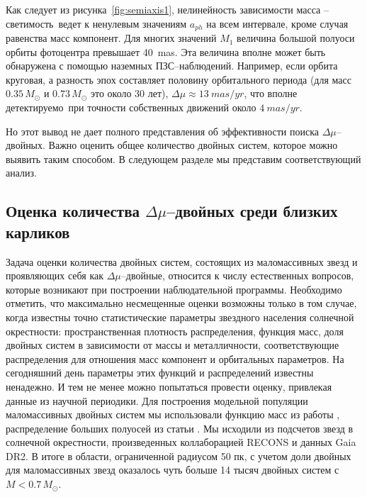 Как следует из рисунка~\ref{fig:semiaxis1}, нелинейность зависимости \glqq масса -- светимость\grqq\ ведет к ненулевым значениям $a_{ph}$ на всем интервале, кроме случая равенства масс компонент. Для многих значений $M_1$ величина большой полуоси орбиты фотоцентра превышает 40~mas. Эта величина вполне может быть обнаружена с помощью наземных ПЗС--наблюдений. Например, если орбита круговая, а разность эпох составляет половину орбитального периода (для масс  $0.35\,M_\odot$ и $0.73\,M_\odot$ это около 30 лет), $\Delta\mu\approx 13~mas/yr$, что вполне \glqq детектируемо\grqq\ при точности собственных движений около $4~mas/yr$.  

Но этот вывод не дает полного представления об эффективности поиска  $\Delta\mu$--двойных. Важно оценить общее количество двойных систем, которое можно выявить таким способом. В следующем разделе мы представим соответствующий анализ.

\subsection{Оценка количества $\Delta\mu$--двойных среди близких карликов}\label{subsec:ch1/sect2/sub2}
Задача оценки количества двойных систем, состоящих из маломассивных звезд и проявляющих себя как $\Delta\mu$--двойные, относится к числу естественных вопросов, которые возникают при построении наблюдательной программы. Необходимо отметить, что максимально несмещенные оценки возможны только в том случае, когда известны  точно статистические параметры звездного населения солнечной окрестности: пространственная плотность распределения, функция  масс, доля двойных систем в зависимости от массы и металличности, соответствующие распределения для отношения масс компонент и орбитальных параметров. На сегодняшний день параметры этих функций и распределений известны ненадежно. И тем не менее можно попытаться провести оценку, привлекая данные из научной периодики. Для построения модельной популяции маломассивных двойных систем мы использовали функцию масс из работы \cite{2005ASSL..327...41C},
распределение больших полуосей из статьи \cite{2010ApJS..190....1R}. Мы исходили из подсчетов звезд в солнечной окрестности, произведенных коллаборацией RECONS \cite{2019AJ....157..216W} и данных Gaia DR2. В итоге в области, ограниченной радиусом 50 пк, с учетом доли двойных для маломассивных звезд оказалось чуть больше 14 тысяч двойных систем с $M<0.7\,M_\odot$. 

